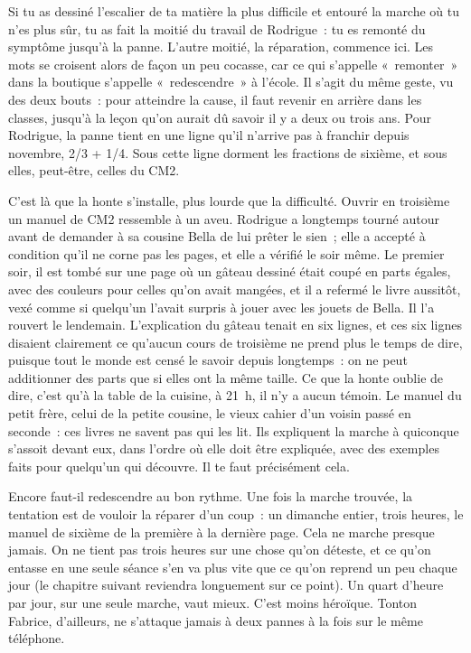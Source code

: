 \documentclass[10.5pt,twoside,openright]{book}
\begin{document}
Si tu as dessiné l’escalier de ta matière la plus difficile et entouré la marche où tu n’es plus sûr, tu as fait la moitié du travail de Rodrigue : tu es remonté du symptôme jusqu’à la panne. L’autre moitié, la réparation, commence ici. Les mots se croisent alors de façon un peu cocasse, car ce qui s’appelle « remonter » dans la boutique s’appelle « redescendre » à l’école. Il s’agit du même geste, vu des deux bouts : pour atteindre la cause, il faut revenir en arrière dans les classes, jusqu’à la leçon qu’on aurait dû savoir il y a deux ou trois ans. Pour Rodrigue, la panne tient en une ligne qu’il n’arrive pas à franchir depuis novembre, 2/3 + 1/4. Sous cette ligne dorment les fractions de sixième, et sous elles, peut-être, celles du CM2.

C’est là que la honte s’installe, plus lourde que la difficulté. Ouvrir en troisième un manuel de CM2 ressemble à un aveu. Rodrigue a longtemps tourné autour avant de demander à sa cousine Bella de lui prêter le sien ; elle a accepté à condition qu’il ne corne pas les pages, et elle a vérifié le soir même. Le premier soir, il est tombé sur une page où un gâteau dessiné était coupé en parts égales, avec des couleurs pour celles qu’on avait mangées, et il a refermé le livre aussitôt, vexé comme si quelqu’un l’avait surpris à jouer avec les jouets de Bella. Il l’a rouvert le lendemain. L’explication du gâteau tenait en six lignes, et ces six lignes disaient clairement ce qu’aucun cours de troisième ne prend plus le temps de dire, puisque tout le monde est censé le savoir depuis longtemps : on ne peut additionner des parts que si elles ont la même taille. Ce que la honte oublie de dire, c’est qu’à la table de la cuisine, à 21 h, il n’y a aucun témoin. Le manuel du petit frère, celui de la petite cousine, le vieux cahier d’un voisin passé en seconde : ces livres ne savent pas qui les lit. Ils expliquent la marche à quiconque s’assoit devant eux, dans l’ordre où elle doit être expliquée, avec des exemples faits pour quelqu’un qui découvre. Il te faut précisément cela.

Encore faut-il redescendre au bon rythme. Une fois la marche trouvée, la tentation est de vouloir la réparer d’un coup : un dimanche entier, trois heures, le manuel de sixième de la première à la dernière page. Cela ne marche presque jamais. On ne tient pas trois heures sur une chose qu’on déteste, et ce qu’on entasse en une seule séance s’en va plus vite que ce qu’on reprend un peu chaque jour (le chapitre suivant reviendra longuement sur ce point). Un quart d’heure par jour, sur une seule marche, vaut mieux. C’est moins héroïque. Tonton Fabrice, d’ailleurs, ne s’attaque jamais à deux pannes à la fois sur le même téléphone.
\end{document}
